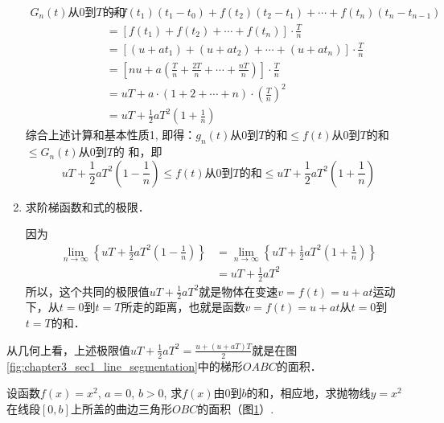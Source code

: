 \begin{solution}
\begin{enumerate}
\begin{align*}
    \text{$G_n(t)$从0到$T$的和}&=f(t_1)(t_1-t_0)+f(t_2)(t_2-t_1)+\cdots+f(t_n)(t_n-t_{n-1})  \\
   &= \left[f(t_1)+f(t_2)+\cdots+f(t_{n})\right]\cdot \frac{T}{n}\\
    &=\left[(u+at_1)+(u+at_2)+\cdots +(u+at_{n})\right]\cdot \frac{T}{n}\\
    &=\left[nu+a\left(\frac{T}{n}+\frac{2T}{n}+\cdots+\frac{nT}{n}\right)\right]\cdot \frac{T}{n}\\
    &=uT+a\cdot (1+2+\cdots+n)\cdot \left(\frac{T}{n}\right)^2\\
    &=uT+\frac{1}{2}aT^2\left(1+\frac{1}{n}\right)
    \end{align*}
综合上述计算和基本性质1, 即得：$g_n(t)$从0到$T$的和$\le f(t)$从0到$T$的和$\le G_n(t)$从0到$T$的
和，即
\[uT+\frac{1}{2}aT^2\left(1-\frac{1}{n}\right)\le f(t)
\text{从0到$T$的和}\le uT+\frac{1}{2}aT^2\left(1+\frac{1}{n}\right)\]

\item 求阶梯函数和式的极限．

因为
\begin{align*}
    \lim_{n\to\infty}\left\{uT+\frac{1}{2}aT^2\left(1-\frac{1}{n}\right)\right\}&=\lim_{n\to\infty}\left\{uT+\frac{1}{2}aT^2\left(1+\frac{1}{n}\right)\right\}\\
    &=uT+\frac{1}{2}aT^2
\end{align*}
所以，这个共同的极限值$uT+\frac{1}{2}aT^2$就是物体在变速$v=f(t)=u+at$运动下，从$t=0$到$t=T$所走的距离，也就是函数$v=f(t)=u+at$从$t=0$到$t=T$的和．
\end{enumerate}

从几何上看，上述极限值$uT+\frac{1}{2}aT^2=\frac{u+(u+aT)T}{2}$就是在图\ref{fig:chapter3_sec1_line_segmentation}中的梯形$OABC$的面积．
\end{solution}    

\begin{example}
    设函数$f(x)=x^2$, $a=0$, $b>0$, 求$f(x)$由0到$b$的和，相应地，求抛物线$y=x^2$在线段$[0,b]$上所盖的曲边三角形$OBC$的面积（图\ref{fig:chapter3_sec1_y=x^2}）.
\end{example}

\begin{figure}[htp]
    \centering
{}
    \caption{}\label{fig:chapter3_sec1_y=x^2}
\end{figure}

